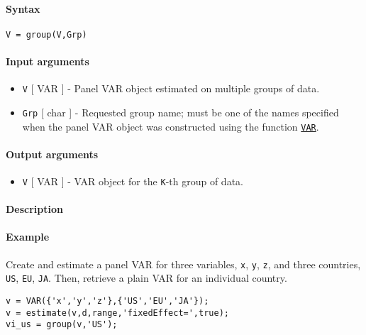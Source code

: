 


	\paragraph{Syntax}\label{syntax}

\begin{verbatim}
V = group(V,Grp)
\end{verbatim}

\paragraph{Input arguments}\label{input-arguments}

\begin{itemize}
\item
  \texttt{V} {[} VAR {]} - Panel VAR object estimated on multiple groups
  of data.
\item
  \texttt{Grp} {[} char {]} - Requested group name; must be one of the
  names specified when the panel VAR object was constructed using the
  function \href{VAR/VAR}{\texttt{VAR}}.
\end{itemize}

\paragraph{Output arguments}\label{output-arguments}

\begin{itemize}
\itemsep1pt\parskip0pt
\item
  \texttt{V} {[} VAR {]} - VAR object for the \texttt{K}-th group of
  data.
\end{itemize}

\paragraph{Description}\label{description}

\paragraph{Example}\label{example}

Create and estimate a panel VAR for three variables, \texttt{x},
\texttt{y}, \texttt{z}, and three countries, \texttt{US}, \texttt{EU},
\texttt{JA}. Then, retrieve a plain VAR for an individual country.

\begin{verbatim}
v = VAR({'x','y','z'},{'US','EU','JA'});
v = estimate(v,d,range,'fixedEffect=',true);
vi_us = group(v,'US');
\end{verbatim}


